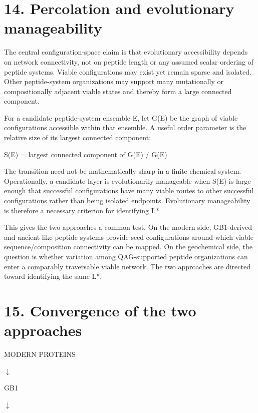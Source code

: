 \documentclass[11pt]{article}
\begin{document}
\hypertarget{percolation-and-evolutionary-manageability}{%
\section*{14. Percolation and evolutionary manageability}\label{percolation-and-evolutionary-manageability}}

The central configuration-space claim is that evolutionary accessibility depends on network connectivity, not on peptide length or any assumed scalar ordering of peptide systems. Viable configurations may exist yet remain sparse and isolated. Other peptide-system organizations may support many mutationally or compositionally adjacent viable states and thereby form a large connected component.

For a candidate peptide-system ensemble E, let G(E) be the graph of viable configurations accessible within that ensemble. A useful order parameter is the relative size of its largest connected component:

S(E) = \textbar largest connected component of G(E)\textbar{} / \textbar G(E)\textbar{}

The transition need not be mathematically sharp in a finite chemical system. Operationally, a candidate layer is evolutionarily manageable when S(E) is large enough that successful configurations have many viable routes to other successful configurations rather than being isolated endpoints. Evolutionary manageability is therefore a necessary criterion for identifying L*.

This gives the two approaches a common test. On the modern side, GB1-derived and ancient-like peptide systems provide seed configurations around which viable sequence/composition connectivity can be mapped. On the geochemical side, the question is whether variation among QAG-supported peptide organizations can enter a comparably traversable viable network. The two approaches are directed toward identifying the same L*.

\hypertarget{convergence-of-the-two-approaches}{%
\section*{15. Convergence of the two approaches}\label{convergence-of-the-two-approaches}}

MODERN PROTEINS

$\downarrow$

GB1

$\downarrow$
\end{document}
